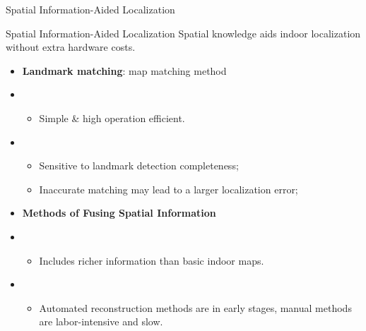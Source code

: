 \begin{frame}{Spatial Information-Aided Localization}

	\begin{block}{Spatial Information-Aided Localization}
		Spatial knowledge aids indoor localization without extra hardware costs.
	\end{block}
	\pause
	\begin{itemize}[<+->]
		\item \textbf{Landmark matching}: map matching method
		\item {}
			\begin{itemize}
				\item Simple \& high operation efficient.
			\end{itemize}
		\item {}
			\begin{itemize}
				\item Sensitive to landmark detection completeness;
				\item Inaccurate matching may lead to a larger localization error;
			\end{itemize}
		\item \textbf{Methods of Fusing Spatial Information}
		\item {}
			\begin{itemize}
				\item Includes richer information than basic indoor maps.
			\end{itemize}
		\item {}
			\begin{itemize}
				\item Automated reconstruction methods are in early stages, manual methods are labor-intensive and slow.
			\end{itemize}
	\end{itemize}

\end{frame}
